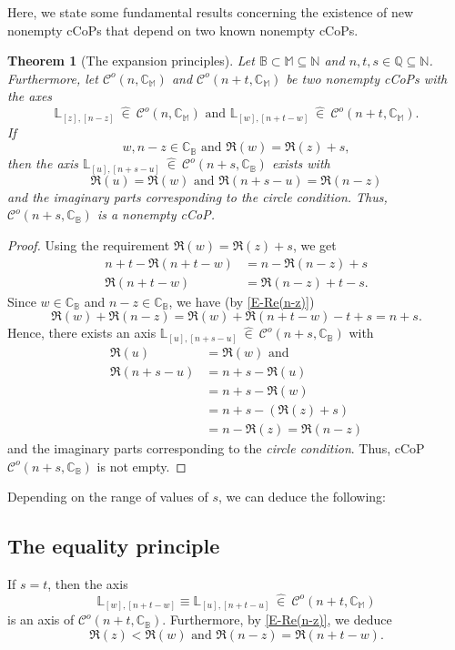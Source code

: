 \documentclass[12pt]{amsart}
\newtheorem{theorem}{Theorem}[section]
\theoremstyle{definition}
\theoremstyle{remark}
\numberwithin{equation}{section}
\newcommand{\inn}{~ \hat{\in}~ }
\newcommand{\C}{\mathcal{C}}
\newcommand{\CC}{\mathbb{C}}
\newcommand{\M}{\mathbb{M}}
\newcommand{\B}{\mathbb{B}}
\newcommand{\N}{\mathbb{N}}
\newcommand{\LL}{\mathbb{L}}
\begin{document}
Here, we state some fundamental results concerning the existence of new nonempty cCoPs that depend on two known nonempty cCoPs.

\begin{theorem}[The expansion principles]\label{T-Expansion}
Let $\B\subset\M\subseteq\N$ and $n,t,s\in\mathbb{Q}\subseteq\N$. Furthermore, let $\C^o(n,\CC_{\M})$ and $\C^o(n+t,\CC_{\M})$
be two nonempty cCoPs with the axes 
\[
\LL_{[z],[n-z]}\inn\C^o(n,\CC_{\M})\mbox{ and }\LL_{[w],[n+t-w]} \inn \C^o(n+t,\CC_{\M}). 
\]
If 
\[
w,n-z\in\CC_{\B}\mbox{ and }\Re(w)=\Re(z)+s, 
\]
then the axis $\LL_{[u],[n+s-u]}\inn \C^o(n+s,\CC_{\B})$ exists with
\[
\Re(u)=\Re(w) \mbox{ and }\Re(n+s-u)=\Re(n-z)
\]
and the imaginary parts corresponding to the \emph{circle condition}. Thus, $\C^o(n+s,\CC_{\B})$ is a nonempty cCoP.
\end{theorem}

\begin{proof}
Using the requirement $\Re(w)=\Re(z)+s$, we get
\begin{align}
n+t-\Re(n+t-w)&=n-\Re(n-z)+s\nonumber\\
\Re(n+t-w)&=\Re(n-z)+t-s.\label{E-Re(n-z)}
\end{align}
Since $w\in\CC_{\B}$ and $n-z\in\CC_{\B}$, we have (by \eqref{E-Re(n-z)})
\[
\Re(w)+\Re(n-z)=\Re(w)+\Re(n+t-w)-t+s=n+s.
\]
Hence, there exists an axis $\LL_{[u],[n+s-u]}\inn\C^o(n+s,\CC_{\B})$ with
\begin{align*}
\Re(u)&=\Re(w) \mbox{ and }\\
\Re(n+s-u)&=n+s-\Re(u)\\
&=n+s-\Re(w)\\
&=n+s-(\Re(z)+s)\\
&=n-\Re(z)=\Re(n-z)
\end{align*}
and the imaginary parts corresponding to the \textit{circle condition}. Thus, cCoP $\C^o(n+s,\CC_{\B})$ is not empty.
\end{proof}
\bigskip

Depending on the range of values of $s$, we can deduce the following:

\subsection{The equality principle}

If $s=t$, then the axis 
\[
\LL_{[w],[n+t-w]}\equiv\LL_{[u],[n+t-u]}\inn\C^o(n+t,\CC_{\M})
\] 
is an axis of $\C^o(n+t,\CC_{\B})$. Furthermore, by \eqref{E-Re(n-z)}, we deduce
\[
\Re(z)<\Re(w)\mbox{ and }\Re(n-z)=\Re(n+t-w).
\]
\end{document}
